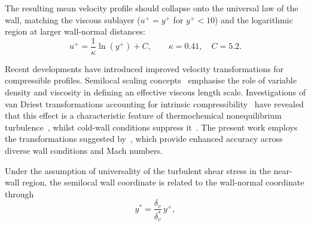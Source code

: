 The resulting mean velocity profile should collapse onto the universal law of the wall, matching the viscous sublayer ($u^{+}=y^{+}$ for $y^{+}<10$) and the logarithmic region at larger wall-normal distances:
\begin{equation}
u^{+} = \frac{1}{\kappa}\ln(y^{+}) + C, 
\qquad \kappa = 0.41, \quad C = 5.2.
\end{equation}

Recent developments have introduced improved velocity transformations for compressible profiles. Semilocal scaling concepts~\citep{TrettelLarsson2016,GriffinEtAl2021,KumarLarsson2022} emphasise the role of variable density and viscosity in defining an effective viscous length scale. Investigations of van Driest transformations accounting for intrinsic compressibility~\citep{HasanEtal2023,HasanEtal2024} have revealed that this effect is a characteristic feature of thermochemical nonequilibrium turbulence~\citep{Williamsetal2025}, whilst cold-wall conditions suppress it~\citep{Zhangetal2018}. The present work employs the transformations suggested by~\citep{HasanEtal2024}, which provide enhanced accuracy across diverse wall conditions and Mach numbers.

Under the assumption of universality of the turbulent shear stress in the near-wall region, the semilocal wall coordinate is related to the wall-normal coordinate through
\begin{equation}
y^{*} = \frac{\delta_{v}}{\delta^{*}_{v}}\, y^{+},
\end{equation}





